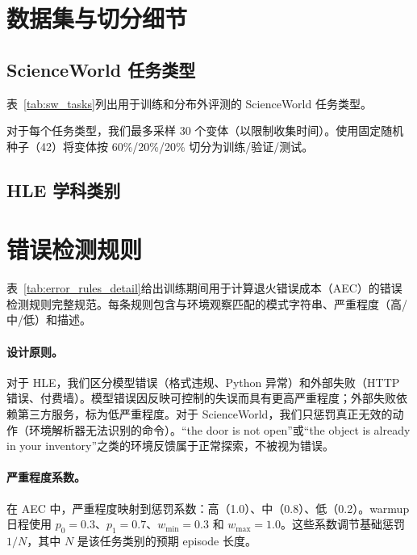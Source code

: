 \section{数据集与切分细节}
\label{app:data}

\subsection{ScienceWorld 任务类型}

表~\ref{tab:sw_tasks}列出用于训练和分布外评测的 ScienceWorld 任务类型。



对于每个任务类型，我们最多采样 30 个变体（以限制收集时间）。使用固定随机种子（42）将变体按 60\%/20\%/20\% 切分为训练/验证/测试。

\subsection{HLE 学科类别}



\section{错误检测规则}
\label{app:error_rules}

表~\ref{tab:error_rules_detail}给出训练期间用于计算退火错误成本（AEC）的错误检测规则完整规范。每条规则包含与环境观察匹配的模式字符串、严重程度（高/中/低）和描述。

\paragraph{设计原则。}
对于 HLE，我们区分模型错误（格式违规、Python 异常）和外部失败（HTTP 错误、付费墙）。模型错误因反映可控制的失误而具有更高严重程度；外部失败依赖第三方服务，标为低严重程度。对于 ScienceWorld，我们只惩罚真正无效的动作（环境解析器无法识别的命令）。“the door is not open”或“the object is already in your inventory”之类的环境反馈属于正常探索，不被视为错误。

\paragraph{严重程度系数。}
在 AEC 中，严重程度映射到惩罚系数：高（1.0）、中（0.8）、低（0.2）。warmup 日程使用 $p_0{=}0.3$、$p_1{=}0.7$、$w_{\min}{=}0.3$ 和 $w_{\max}{=}1.0$。这些系数调节基础惩罚 $1/N$，其中 $N$ 是该任务类别的预期 episode 长度。

